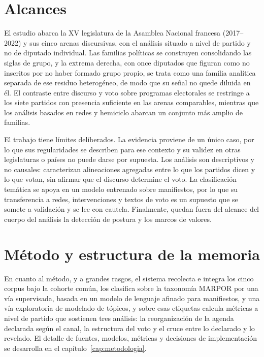 \section{Alcances}
\label{sec:alcances}

El estudio abarca la XV legislatura de la Asamblea Nacional francesa (2017--2022)
y sus cinco arenas discursivas, con el análisis situado a nivel de partido y no
de diputado individual. Las familias políticas se construyen consolidando las
siglas de grupo, y la extrema derecha, con once diputados que figuran como no
inscritos por no haber formado grupo propio, se trata como una familia analítica
separada de ese residuo heterogéneo, de modo que su señal no quede diluida en él.
El contraste entre discurso y voto sobre programas electorales se restringe a los
siete partidos con presencia suficiente en las arenas comparables, mientras que
los análisis basados en redes y hemiciclo abarcan un conjunto más amplio de
familias.

El trabajo tiene límites deliberados. La evidencia proviene de un único caso, por
lo que sus regularidades se describen para ese contexto y su validez en otras
legislaturas o países no puede darse por supuesta. Los análisis son descriptivos
y no causales: caracterizan alineaciones agregadas entre lo que los partidos
dicen y lo que votan, sin afirmar que el discurso determine el voto. La
clasificación temática se apoya en un modelo entrenado sobre manifiestos, por lo
que su transferencia a redes, intervenciones y textos de voto es un supuesto que
se somete a validación y se lee con cautela. Finalmente, quedan fuera del alcance
del cuerpo del análisis la detección de postura y los marcos de valores.

\section{Método y estructura de la memoria}
\label{sec:estructura}

En cuanto al método, y a grandes rasgos, el sistema recolecta e integra los cinco
corpus bajo la cohorte común, los clasifica sobre la taxonomía MARPOR por una vía
supervisada, basada en un modelo de lenguaje afinado para manifiestos, y una vía
exploratoria de modelado de tópicos, y sobre esas etiquetas calcula métricas a
nivel de partido que sostienen tres análisis: la reorganización de la agenda
declarada según el canal, la estructura del voto y el cruce entre lo declarado y
lo revelado. El detalle de fuentes, modelos, métricas y decisiones de
implementación se desarrolla en el capítulo~\ref{cap:metodologia}.


